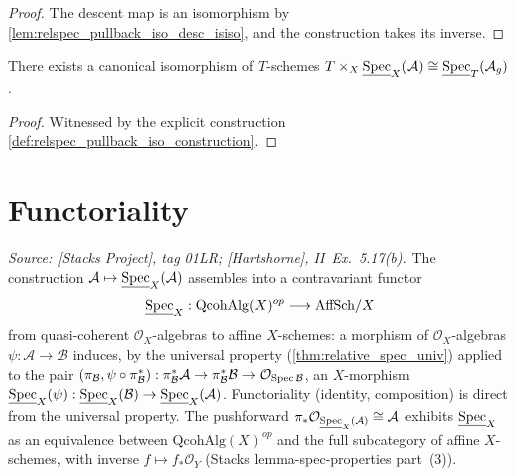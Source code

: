 \begin{proof}
  The descent map is an isomorphism by \cref{lem:relspec_pullback_iso_desc_isiso}, and
  the construction takes its inverse.
\end{proof}

\begin{lemma}
  \label{lem:relspec_pullback_iso}
  There exists a canonical isomorphism of \(T\)-schemes
  \(T \times_X \underline{\operatorname{Spec}}_X(\mathcal{A}) \cong
    \underline{\operatorname{Spec}}_T(\mathcal{A}_g)\).
\end{lemma}

\begin{proof}
  Witnessed by the explicit construction
  \cref{def:relspec_pullback_iso_construction}.
\end{proof}

\section{Functoriality}
\label{sec:relspec_functoriality}

\begin{theorem}
  \label{thm:relative_spec_functorial}
  \textit{Source: [Stacks Project], tag 01LR; [Hartshorne], II~Ex.~5.17(b).}
  The construction \(\mathcal{A} \mapsto \underline{\operatorname{Spec}}_X(\mathcal{A})\) assembles into
  a contravariant functor
  \[
    \underline{\operatorname{Spec}}_X : \mathrm{QcohAlg}(X)^{op} \longrightarrow \mathrm{AffSch}/X
  \]
  from quasi-coherent \(\mathcal{O}_X\)-algebras to affine \(X\)-schemes: a morphism of
  \(\mathcal{O}_X\)-algebras \(\psi : \mathcal{A} \to \mathcal{B}\) induces, by the universal
  property (\cref{thm:relative_spec_univ}) applied to the pair
  $(\pi_{\mathcal{B}}, \psi \circ \pi_{\mathcal{B}}^*) :
  \pi_{\mathcal{B}}^*\mathcal{A} \to \pi_{\mathcal{B}}^*\mathcal{B} \to
  \mathcal{O}_{\operatorname{Spec}\mathcal{B}}$,
  an \(X\)-morphism
  \(\underline{\operatorname{Spec}}_X(\psi) : \underline{\operatorname{Spec}}_X(\mathcal{B}) \to \underline{\operatorname{Spec}}_X(\mathcal{A})\).
  Functoriality (identity, composition) is direct from the universal property. The
  pushforward \(\pi_* \mathcal{O}_{\underline{\operatorname{Spec}}_X(\mathcal{A})} \cong \mathcal{A}\)
  exhibits \(\underline{\operatorname{Spec}}_X\) as an equivalence between \(\mathrm{QcohAlg}(X)^{op}\) and
  the full subcategory of affine \(X\)-schemes, with inverse \(f \mapsto f_* \mathcal{O}_Y\)
  (Stacks lemma-spec-properties part~(3)).
\end{theorem}

